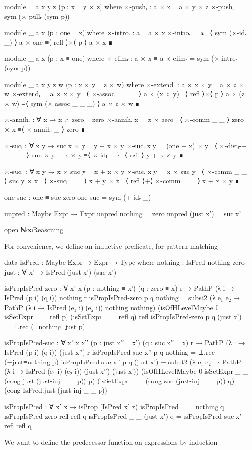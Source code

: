 \begin{code}[hide]
    module _ {a x y z} (p : x ≡ y × z) where
      ×-pushᵣ : a × x ≡ a × y × z
      ×-pushᵣ = sym (×-pullᵣ (sym p))

    module _ {a x} (p : one ≡ x) where
      ×-introᵣ : a ≡ a × x
      ×-introᵣ =
        a       ≡⟨ sym (×-idᵣ _) ⟩
        a × one ≡⟨ refl ⟩×⟨ p ⟩
        a × x   ∎

    module _ {a x} (p : x ≡ one) where
      ×-elimᵣ : a × x ≡ a
      ×-elimᵣ = sym (×-introᵣ (sym p))

    module _ {a x y z w} (p : x × y ≡ z × w) where
      ×-extendᵣ : a × x × y ≡ a × z × w
      ×-extendᵣ =
        a × x × y   ≡⟨ ×-assoc _ _ _ ⟩
        a × (x × y) ≡⟨ refl ⟩×⟨ p ⟩
        a × (z × w) ≡⟨ sym (×-assoc _ _ _) ⟩
        a × z × w   ∎

    ×-annihᵣ : ∀ x → x × zero ≡ zero
    ×-annihᵣ x =
      x × zero ≡⟨ ×-comm _ _ ⟩
      zero × x ≡⟨ ×-annihₗ _ ⟩
      zero     ∎

    ×-sucₗ : ∀ x y → suc x × y ≡ y + x × y
    ×-sucₗ x y =
      (one + x) × y   ≡⟨ ×-distₗ-+ _ _ _ ⟩
      one × y + x × y ≡⟨ ×-idₗ _ ⟩+⟨ refl ⟩
      y + x × y       ∎

    ×-sucᵣ : ∀ x y → x × suc y ≡ x + x × y
    ×-sucᵣ x y =
      x × suc y ≡⟨ ×-comm _ _ ⟩
      suc y × x ≡⟨ ×-sucₗ _ _ ⟩
      x + y × x ≡⟨ refl ⟩+⟨ ×-comm _ _ ⟩
      x + x × y ∎

    one-suc : one ≡ suc zero
    one-suc = sym (+-idᵣ _)

    unpred : Maybe Expr → Expr
    unpred nothing = zero
    unpred (just x') = suc x'

  open ℕ∞Reasoning
\end{code}
For convenience, we define an inductive predicate, for pattern matching
\begin{code}
  data IsPred : Maybe Expr → Expr → Type where
    nothing  :         IsPred nothing    zero
    just     : ∀ x' →  IsPred (just x')  (suc x')
\end{code}
\begin{code}[hide]
  isPropIsPred-zero :
    ∀ {x' x} (p : nothing ≡ x') (q : zero ≡ x) r →
    PathP (λ i → IsPred (p i) (q i)) nothing r
  isPropIsPred-zero p q nothing =
    subst2 (λ e₁ e₂ → PathP (λ i → IsPred (e₁ i) (e₂ i)) nothing nothing)
      (isOfHLevelMaybe 0 isSetExpr _ _ refl p)
      (isSetExpr _ _ refl q)
      refl
  isPropIsPred-zero p q (just x') = ⊥.rec (¬nothing≡just p)

  isPropIsPred-suc :
    ∀ {x' x} x'′ (p : just x'′ ≡ x') (q : suc x'′ ≡ x) r →
    PathP (λ i → IsPred (p i) (q i)) (just x'′) r
  isPropIsPred-suc x'′ p q nothing = ⊥.rec (¬just≡nothing p)
  isPropIsPred-suc x'′ p q (just x') =
    subst2 (λ e₁ e₂ → PathP (λ i → IsPred (e₁ i) (e₂ i)) (just x'′) (just x'))
      (isOfHLevelMaybe 0 isSetExpr _ _ (cong just (just-inj _ _ p)) p)
      (isSetExpr _ _ (cong suc (just-inj _ _ p)) q)
      (cong IsPred.just (just-inj _ _ p))

  isPropIsPred : ∀ x' x → isProp (IsPred x' x)
  isPropIsPred _ _ nothing q = isPropIsPred-zero refl refl q
  isPropIsPred _ _ (just x') q = isPropIsPred-suc x' refl refl q
\end{code}
We want to define the predecessor function on expressions by induction

